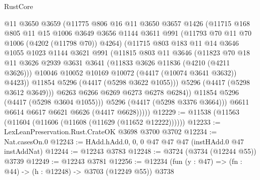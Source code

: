 \begin{lexlean}{RustCore}
\begin{coremodule}
                  @11
                  @3650
                  @3659
                  (@11775
                    @806
                    @16
                    @11
                    @3650
                    @3657
                    @1426
                    (@11715
                      @168
                      @805
                      @11
                      @15
                      @1006
                      @3649
                      @3656
                      @1144
                      @3611
                      @991
                      (@11793 @70 @11 @70 @1006 (@4202 (@11798 @70)) @4264)
                      (@11715
                        @803
                        @183
                        @11
                        @14
                        @3646
                        @1055
                        @1023
                        @1144
                        @3621
                        @991
                        (@11815
                          @803
                          @11
                          @3646
                          (@11823
                            @70
                            @18
                            @11
                            @3626
                            @2939
                            @3631
                            @3641
                            (@11833 @3626 @11836 (@4210 (@4211 @3626)))
                            @10046
                            @10052
                            @10169
                            @10072
                            (@4417 (@10074 @3641 @3632))
                            @4423))
                        @11854
                        @5296
                        (@4417 (@5298 @3622 @1055)))
                      @5296
                      (@4417 (@5298 @3612 @3649)))
                    @6263
                    @6266
                    @6269
                    @6273
                    @6278
                    @6284))
                @11854
                @5296
                (@4417 (@5298 @3604 @1055)))
              @5296
              (@4417 (@5298 @3376 @3664)))
            @6611
            @6614
            @6617
            @6621
            @6626
            (@4417 @6628)))))
@12229 := @11538 (@11563 (@11604 (@11606 (@11608 (@11629 (@11652 @12222))))))
@12233 := LexLeanPreservation.Rust.CrateOK @3698 @3700 @3702
@12234 := Nat.casesOn.{0}
@12243 := HAdd.hAdd.{0, 0, 0} @47 @47 @47 (instHAdd.{0} @47 instAddNat)
@12244 := @12243 @3783
@12248 := @3724 (@3734 (@12244 @55)) @3739
@12249 := @12243 @3781
@12256 := @12234 (fun (y : @47) => (fn : @44) -> (h : @12248) -> @3703 (@12249 @55)) @3738

\end{coremodule}
\end{lexlean}
